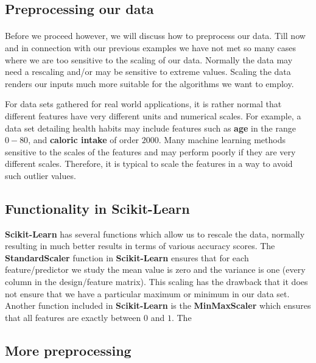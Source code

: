 \documentclass[%
oneside,                 %
final,                   %
10pt]{article}
\begin{document}
\subsection{Preprocessing our data}

\paragraph{}

Before we proceed however, we will discuss how to preprocess our
data. Till now and in connection with our previous examples we have
not met so many cases where we are too sensitive to the scaling of our
data. Normally the data may need a rescaling and/or may be sensitive
to extreme values. Scaling the data renders our inputs much more
suitable for the algorithms we want to employ.

For data sets gathered for real world applications, it is rather normal that
different features have very different units and
numerical scales. For example, a data set detailing health habits may include
features such as \textbf{age} in the range $0-80$, and \textbf{caloric intake} of order $2000$.
Many machine learning methods sensitive to the scales of the features and may perform poorly if they
are very different scales. Therefore, it is typical to scale
the features in a way to avoid such outlier values.



\subsection{Functionality in Scikit-Learn}

\textbf{Scikit-Learn} has several functions which allow us to rescale the
data, normally resulting in much better results in terms of various
accuracy scores.  The \textbf{StandardScaler} function in \textbf{Scikit-Learn}
ensures that for each feature/predictor we study the mean value is
zero and the variance is one (every column in the design/feature
matrix).  This scaling has the drawback that it does not ensure that
we have a particular maximum or minimum in our data set. Another
function included in \textbf{Scikit-Learn} is the \textbf{MinMaxScaler} which
ensures that all features are exactly between $0$ and $1$. The

\subsection{More preprocessing}
\end{document}
